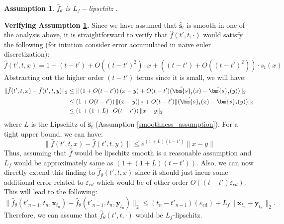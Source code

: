 \documentclass[11pt]{article}
\newcommand{\xh}[1]{\textcolor[HTML]{66CCFF}{#1}}
\def\vs{{\bm{s}}}
\def\vx{{\bm{x}}}
\def\vy{{\bm{y}}}
\newtheorem{assumption}{Assumption}
\begin{document}
\begin{assumption}
\label{smooth_f}
    \textit{$\hat{f}_\theta$ is $L_f-$lipschitz} \cite{kim2023consistency, song2023consistency, lyu2024sampling}. \\
\end{assumption}

\noindent
\textbf{Verifying Assumption \ref{smooth_f}.}  Since we have assumed that $\hat{\vs}_t$ is smooth in one of the analysis above, it is straightforward to verify that $\hat{f}(t',t,\cdot)$ would satisfy the following (for intution consider error accumulated in naive euler discretization):
\[
\hat{f}(t', t, x) = 1 + (t - t') + {O}((t - t')^2) \cdot x + \left((t - t') + {O}((t - t')^2)\right) \cdot s_t(x)
\]
Abstracting out the higher order $(t-t')$ terms since it is small, we will have:
\begin{align}
\label{approx_smooth_hat_f}
\|\hat{f}(t',t,x)-\hat{f}(t',t,y)\|_2
&\leq \|\left(1+ O(t-t')\right) (x-y)
+ O(t-t') (\hat{\vs}_t(x)-\hat{\vs}_t(y)) \|_2 \notag \\
&\leq \left(1+ O(t-t')\right) \|(x-y) \|_2
+ O(t-t') \|(\hat{\vs}_t(x)-\hat{\vs}_t(y)) \|_2 \notag\\
&\leq
\left(1+(1+L)\cdot O(t-t')\right) \|x-y\|_2  
\end{align}
where $L$ is the Lipschitz of $\hat{\vs}_t$ (Assumption \ref{smoothness_assumption}). For a tight upper bound, we can have:
\[
\|\hat{f}(t',t,x)-\hat{f}(t',t,y)\| \leq 
e^{(1+L)(t-t')} \|x-y\|  
\]
Thus, assuming that $\hat{f}$ would be lipschitz smooth is a reasonable assumption and $L_f$ would be approximately same as $(1+(1+L)(t-t'))$.
Also, we can now directly extend this finding to $\hat{f}_\theta(t',t,x)$ since it should just incur some additional error related to $\varepsilon_{cd}$ which would be of other order $O((t-t')\varepsilon_{cd})$. This will lead to the following:
\[
\| \hat{f}_{\theta}(t'_{n-1}, t_{n}, \vx_{t_n}) - \hat{f}_{\theta}(t'_{n-1}, t_{n}, \vy_{t_n}) \|_2 \leq (t_n - t'_{n-1})(\varepsilon_{\text{cd}}) + L_f \| \vx_{t_n} - \vy_{t_n} \|_2.
\]
Therefore, we can assume that $\hat{f}_\theta(t',t,\cdot)$ would be $L_f$-lipschitz.
\end{document}
